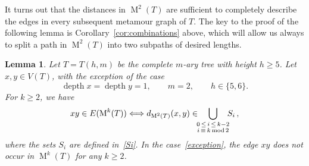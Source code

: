 \documentclass[12pt]{amsart}
\newtheorem{lemma}[theorem]{Lemma}
\theoremstyle{definition}
\theoremstyle{remark}
\numberwithin{equation}{section}
\numberwithin{figure}{section}
\renewcommand{\mod}{\operatorname{mod}}
\newcommand{\M}{\operatorname{M}}
\begin{document}
It turns out that the distances in $\M^2(T)$ are sufficient to completely describe the edges in every subsequent metamour graph of $T$.
The key to the proof of the following lemma is Corollary~\ref{cor:combinations} above, which will allow us always to split a path in $\M^2(T)$ into two subpaths of desired lengths.

\begin{lemma}
    \label{theorem: m-ary trees}
    Let $T = T(h,m)$ be the complete $m$-ary tree with height $h \geq 5$.
    Let $x,y \in V(T)$, with the exception of the case 
    \begin{equation}
        \label{exception}
        \operatorname{depth} x = \operatorname{depth} y = 1, \qquad m=2, \qquad h \in \{5,6\}.
    \end{equation}
    For $k \geq 2$, we have
   \[
    xy \in E(\M^k(T)) \Longleftrightarrow d_{\M^2(T)}(x,y) \in\quad \bigcup_{\mathclap{\substack{0\,\le\, i\, \leq\, k-2\\ i\, \equiv\, k \mod 2}}}\quad  S_i\,,
    \]
    where the sets $S_i$ are defined in~\eqref{Si}.
    In the case~\eqref{exception}, the edge $xy$ does not occur in $\M^k(T)$ for any $k \geq 2$.
\end{lemma}
\end{document}

